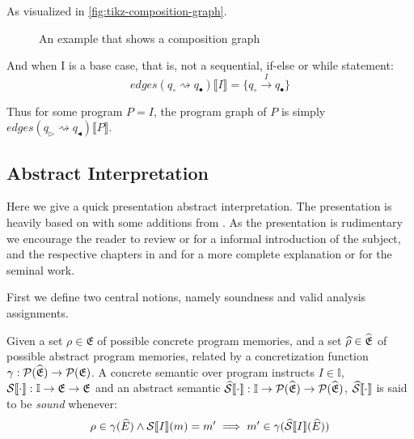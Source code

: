 As visualized in \autoref{fig:tikz-composition-graph}.

\begin{figure}
    \center
    
    \caption{An example that shows a composition graph}
    \label{fig:tikz-composition-graph}
\end{figure}

And when I is a base case, that is, not a sequential, if-else or while statement:
\begin{equation}
    edges(q_\circ \rightsquigarrow q_\bullet) \llbracket I \rrbracket = \{q_\circ \xrightarrow{I} q_\bullet\}
\end{equation}

Thus for some program $P = I$, the program graph of $P$ is simply $edges(q_\triangleright \rightsquigarrow q_\blacktriangleleft)\llbracket P \rrbracket$.

\subsection{Abstract Interpretation}\label{subsec:abstract-interpretation}

Here we give a quick presentation abstract interpretation.
The presentation is heavily based on \cite{nielson_formal_2019} with some additions from \cite{moller_statitc_nodate}.
As the presentation is rudimentary we encourage the reader to review \cite{noauthor_abstract_nodate} or \cite{cousot_abstract_1996} for a informal introduction of the subject, and the respective chapters in \cite{nielson_formal_2019} and \cite{moller_statitc_nodate} for a more complete explanation or \cite{cousot_abstract_1977} for the seminal work.

First we define two central notions, namely soundness and valid analysis assignments.

\begin{definition}
    Given a set $\rho \in \mathfrak{E}$ of possible concrete program memories, and a set $\widehat{\rho} \in \widehat{\mathfrak{E}}$ of possible abstract program memories, related by a concretization function $\gamma : \mathcal{P}(\widehat{\mathfrak{E}}) \rightarrow \mathcal{P}(\mathfrak{E})$.
    A concrete semantic over program instructs $I \in \mathbb{I}$, $\mathcal{S} \llbracket \cdot \rrbracket : \mathbb{I} \rightarrow \mathfrak{E} \rightarrow \mathfrak{E}$ and an abstract semantic $\widehat{\mathcal{S}} \llbracket \cdot \rrbracket : \mathbb{I} \rightarrow \mathcal{P}(\widehat{\mathfrak{E}}) \rightarrow \mathcal{P}(\widehat{\mathfrak{E}})$, $\widehat{\mathcal{S}} \llbracket \cdot \rrbracket$ is said to be \emph{sound} whenever:
    \begin{equation}
        \rho \in \gamma(\widehat{E}) \land \mathcal{S} \llbracket I \rrbracket(m) = m' \implies m' \in \gamma(\widehat{\mathcal{S}} \llbracket I \rrbracket(\widehat{E}))
    \end{equation}
\end{definition}

